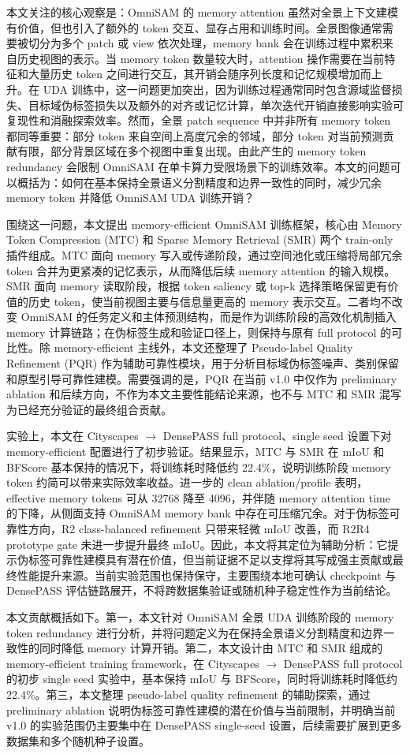 本文关注的核心观察是：OmniSAM 的 memory attention 虽然对全景上下文建模有价值，但也引入了额外的 token 交互、显存占用和训练时间。全景图像通常需要被切分为多个 patch 或 view 依次处理，memory bank 会在训练过程中累积来自历史视图的表示。当 memory token 数量较大时，attention 操作需要在当前特征和大量历史 token 之间进行交互，其开销会随序列长度和记忆规模增加而上升。在 UDA 训练中，这一问题更加突出，因为训练过程通常同时包含源域监督损失、目标域伪标签损失以及额外的对齐或记忆计算，单次迭代开销直接影响实验可复现性和消融探索效率。然而，全景 patch sequence 中并非所有 memory token 都同等重要：部分 token 来自空间上高度冗余的邻域，部分 token 对当前预测贡献有限，部分背景区域在多个视图中重复出现。由此产生的 memory token redundancy 会限制 OmniSAM 在单卡算力受限场景下的训练效率。本文的问题可以概括为：如何在基本保持全景语义分割精度和边界一致性的同时，减少冗余 memory token 并降低 OmniSAM UDA 训练开销？

围绕这一问题，本文提出 memory-efficient OmniSAM 训练框架，核心由 Memory Token Compression (MTC) 和 Sparse Memory Retrieval (SMR) 两个 train-only 插件组成。MTC 面向 memory 写入或传递阶段，通过空间池化或压缩将局部冗余 token 合并为更紧凑的记忆表示，从而降低后续 memory attention 的输入规模。SMR 面向 memory 读取阶段，根据 token saliency 或 top-k 选择策略保留更有价值的历史 token，使当前视图主要与信息量更高的 memory 表示交互。二者均不改变 OmniSAM 的任务定义和主体预测结构，而是作为训练阶段的高效化机制插入 memory 计算链路；在伪标签生成和验证口径上，则保持与原有 full protocol 的可比性。除 memory-efficient 主线外，本文还整理了 Pseudo-label Quality Refinement (PQR) 作为辅助可靠性模块，用于分析目标域伪标签噪声、类别保留和原型引导可靠性建模。需要强调的是，PQR 在当前 v1.0 中仅作为 preliminary ablation 和后续方向，不作为本文主要性能结论来源，也不与 MTC 和 SMR 混写为已经充分验证的最终组合贡献。

实验上，本文在 Cityscapes $\rightarrow$ DensePASS full protocol、single seed 设置下对 memory-efficient 配置进行了初步验证。结果显示，MTC 与 SMR 在 mIoU 和 BFScore 基本保持的情况下，将训练耗时降低约 22.4\%，说明训练阶段 memory token 约简可以带来实际效率收益。进一步的 clean ablation/profile 表明，effective memory tokens 可从 32768 降至 4096，并伴随 memory attention time 的下降，从侧面支持 OmniSAM memory bank 中存在可压缩冗余。对于伪标签可靠性方向，R2 class-balanced refinement 只带来轻微 mIoU 改善，而 R2R4 prototype gate 未进一步提升最终 mIoU。因此，本文将其定位为辅助分析：它提示伪标签可靠性建模具有潜在价值，但当前证据不足以支撑将其写成强主贡献或最终性能提升来源。当前实验范围也保持保守，主要围绕本地可确认 checkpoint 与 DensePASS 评估链路展开，不将跨数据集验证或随机种子稳定性作为当前结论。

本文贡献概括如下。第一，本文针对 OmniSAM 全景 UDA 训练阶段的 memory token redundancy 进行分析，并将问题定义为在保持全景语义分割精度和边界一致性的同时降低 memory 计算开销。第二，本文设计由 MTC 和 SMR 组成的 memory-efficient training framework，在 Cityscapes $\rightarrow$ DensePASS full protocol 的初步 single seed 实验中，基本保持 mIoU 与 BFScore，同时将训练耗时降低约 22.4\%。第三，本文整理 pseudo-label quality refinement 的辅助探索，通过 preliminary ablation 说明伪标签可靠性建模的潜在价值与当前限制，并明确当前 v1.0 的实验范围仍主要集中在 DensePASS single-seed 设置，后续需要扩展到更多数据集和多个随机种子设置。
